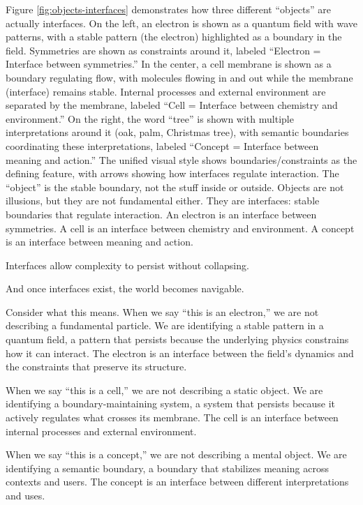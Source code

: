 \documentclass[
  openright]{book}
\begin{document}
Figure \ref{fig:objects-interfaces} demonstrates how three different
``objects'' are actually interfaces. On the left, an electron is shown
as a quantum field with wave patterns, with a stable pattern (the
electron) highlighted as a boundary in the field. Symmetries are shown
as constraints around it, labeled ``Electron = Interface between
symmetries.'' In the center, a cell membrane is shown as a boundary
regulating flow, with molecules flowing in and out while the membrane
(interface) remains stable. Internal processes and external environment
are separated by the membrane, labeled ``Cell = Interface between
chemistry and environment.'' On the right, the word ``tree'' is shown
with multiple interpretations around it (oak, palm, Christmas tree),
with semantic boundaries coordinating these interpretations, labeled
``Concept = Interface between meaning and action.'' The unified visual
style shows boundaries/constraints as the defining feature, with arrows
showing how interfaces regulate interaction. The ``object'' is the
stable boundary, not the stuff inside or outside. Objects are not
illusions, but they are not fundamental either. They are interfaces:
stable boundaries that regulate interaction. An electron is an interface
between symmetries. A cell is an interface between chemistry and
environment. A concept is an interface between meaning and action.

Interfaces allow complexity to persist without collapsing.

And once interfaces exist, the world becomes navigable.

Consider what this means. When we say ``this is an electron,'' we are
not describing a fundamental particle. We are identifying a stable
pattern in a quantum field, a pattern that persists because the
underlying physics constrains how it can interact. The electron is an
interface between the field's dynamics and the constraints that preserve
its structure.

When we say ``this is a cell,'' we are not describing a static object.
We are identifying a boundary-maintaining system, a system that persists
because it actively regulates what crosses its membrane. The cell is an
interface between internal processes and external environment.

When we say ``this is a concept,'' we are not describing a mental
object. We are identifying a semantic boundary, a boundary that
stabilizes meaning across contexts and users. The concept is an
interface between different interpretations and uses.
\end{document}
